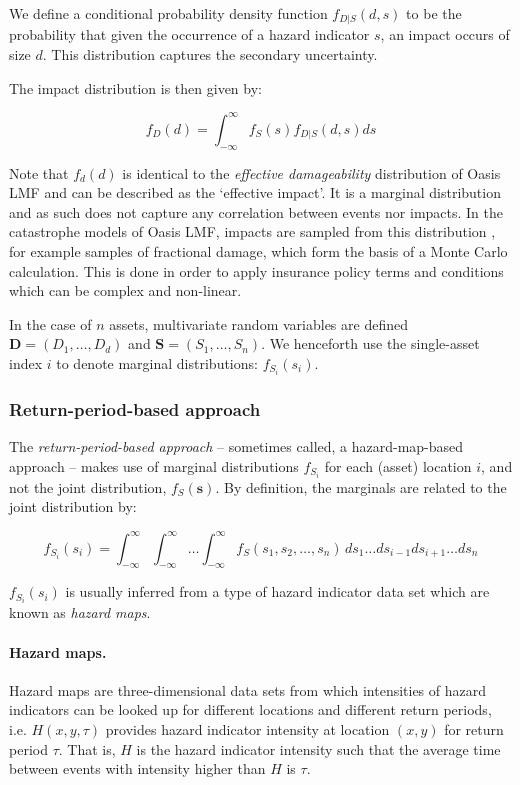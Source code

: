 \documentclass[a4paper,11pt]{extarticle} %
\begin{document}
We define a conditional probability density function $f_{D|S}(d, s)$ to be the probability that given the occurrence of a hazard indicator $s$, an impact occurs of size $d$. This distribution captures the secondary uncertainty.

The impact distribution is then given by:

  \begin{equation}
     \label{Eq:ImpactEffective}
     f_D(d) = \int_{-\infty}^{\infty} f_S(s) f_{D|S}(d, s) ds
 \end{equation}

Note that $f_d(d)$ is identical to the {\it effective damageability} distribution of Oasis LMF\cite{OasisFinancialModule} and can be described as the `effective impact'. It is a marginal distribution and as such does not capture any correlation between events nor impacts. In the catastrophe models of Oasis LMF, impacts are sampled from this distribution \cite{OasisFinancialModule}, for example samples of fractional damage, which form the basis of a Monte Carlo calculation. This is done in order to apply insurance policy terms and conditions which can be complex and non-linear.

In the case of $n$ assets, multivariate random variables are defined $\mathbf{D} = (D_1,\ldots,D_d)$ and $\mathbf{S} = (S_1,\ldots,S_n)$. We henceforth use the single-asset index $i$ to denote marginal distributions: $f_{S_i}(s_i)$.

\subsubsection{Return-period-based approach}

The \emph{return-period-based approach} -- sometimes called, a hazard-map-based approach -- makes use of marginal distributions $f_{S_i}$ for each (asset) location $i$, and not the joint distribution, $f_S(\mathbf{s})$. By definition, the marginals are related to the joint distribution by:

 \begin{equation}
    \label{Eq:ImpactMarginal}
    f_{S_i}(s_i) = \int_{-\infty}^{\infty} \int_{-\infty}^{\infty} \dots \int_{-\infty}^{\infty} f_S(s_1,s_2, \dots,s_n) \,ds_1 \dots ds_{i-1} ds_{i + 1} \dots ds_n
\end{equation}

$f_{S_i}(s_i)$ is usually inferred from a type of hazard indicator data set which are known as \emph{hazard maps}.

\paragraph{Hazard maps.} Hazard maps are three-dimensional data sets from which intensities of hazard indicators can be looked up for different locations and different return periods, i.e. $H(x, y, \tau)$ provides hazard indicator intensity at location $(x, y)$ for return period $\tau$. That is, $H$ is the hazard indicator intensity such that the average time between events with intensity higher than $H$ is $\tau$.
\end{document}
